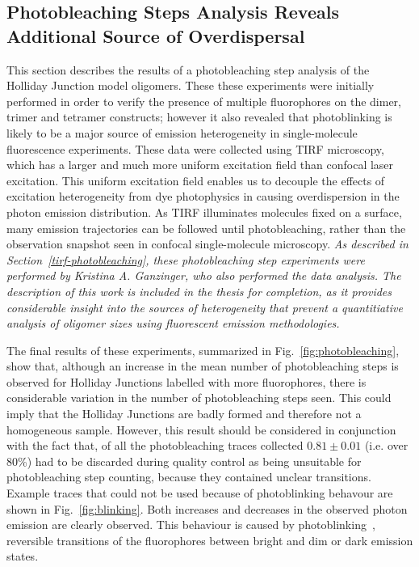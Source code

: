 \subsection{Photobleaching Steps Analysis Reveals Additional Source of Overdispersal}
This section describes the results of a photobleaching step analysis of the Holliday Junction model oligomers. These these experiments were initially performed in order to verify the presence of multiple fluorophores on the dimer, trimer and tetramer constructs; however it also revealed that photoblinking is likely to be a major source of emission heterogeneity in single-molecule fluorescence experiments. These data were collected using TIRF microscopy, which has a larger and much more uniform excitation field than confocal laser excitation. This uniform excitation field enables us to decouple the effects of excitation heterogeneity from dye photophysics in causing overdispersion in the photon emission distribution. As TIRF illuminates molecules fixed on a surface,  many emission trajectories can be followed until photobleaching, rather than the observation snapshot seen in confocal single-molecule microscopy. \emph{As described in Section~\ref{tirf-photobleaching}, these photobleaching step experiments were performed by Kristina A. Ganzinger, who also performed the data analysis. The description of this work is included in the thesis for completion, as it provides considerable insight into the sources of heterogeneity that prevent a quantitiative analysis of oligomer sizes using fluorescent emission methodologies.} 

The final results of these experiments, summarized in Fig.~\ref{fig:photobleaching}, show that, although  an increase in the mean number of photobleaching steps is observed for Holliday Junctions labelled with more fluorophores, there is considerable variation in the number of photobleaching steps seen. This could imply that the Holliday Junctions are badly formed and therefore not a homogeneous sample. However, this result should be considered in conjunction with the fact that, of all the photobleaching traces collected $0.81 \pm 0.01$ (i.e. over 80\%) had to be discarded during quality control as being unsuitable for photobleaching step counting, because they contained unclear transitions. Example traces that could not be used because of photoblinking behavour are shown in Fig.~\ref{fig:blinking}. Both increases and decreases in the observed photon emission are clearly observed. This behaviour is caused by photoblinking~\cite{zondervan03}, reversible transitions of the fluorophores between bright and dim or dark emission states.

